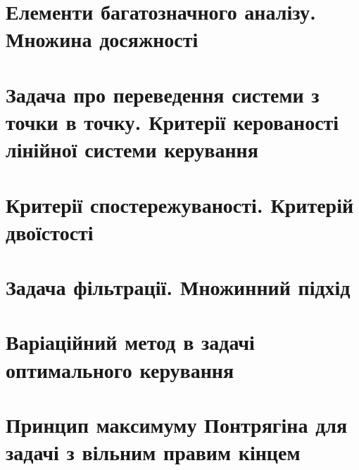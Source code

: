 \documentclass[a5paper, 10pt]{article}
\theoremstyle{definition}
\numberwithin{equation}{section}
\begin{document}
 \newpage
 \newpage
 \newpage

\section{Елементи багатозначного аналізу. Множина досяжності}

 \newpage
 \newpage
 \newpage

\section{Задача про переведення системи з точки в точку. Критерії керованості лінійної системи керування}

 \newpage
 \newpage
 \newpage

\section{Критерії спостережуваності. Критерій двоїстості}

 \newpage
 \newpage
 \newpage

\section{Задача фільтрації. Множинний підхід}

 \newpage
 \newpage
 \newpage

\section{Варіаційний метод в задачі оптимального керування}

 \newpage
 \newpage
 \newpage

\section{Принцип максимуму Понтрягіна для задачі з вільним правим кінцем}

 \newpage
 \newpage
 \newpage
\end{document}
